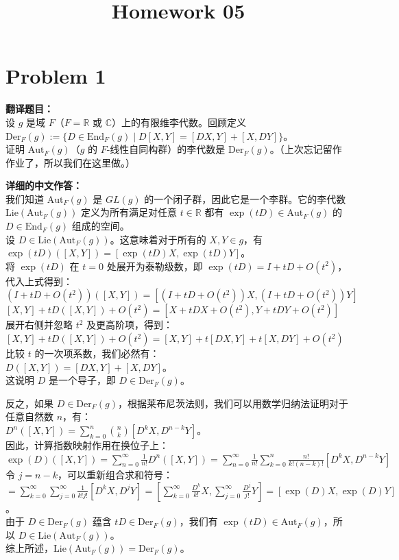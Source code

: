 \documentclass{ctexart}
\begin{document}
\title{Homework 05}
\author{}
\date{}
\maketitle

\section*{Problem 1}
\textbf{翻译题目：}\\
设 $g$ 是域 $F$（$F = \mathbb{R}$ 或 $\mathbb{C}$）上的有限维李代数。回顾定义\\
$\text{Der}_F(g) := \{D \in \text{End}_F(g) \mid D[X, Y] = [DX, Y] + [X, DY]\}$。\\
证明 $\text{Aut}_F(g)$（$g$ 的 $F$-线性自同构群）的李代数是 $\text{Der}_F(g)$。（上次忘记留作作业了，所以我们在这里做。）

\vspace{1em}
\textbf{详细的中文作答：}\\
我们知道 $\text{Aut}_F(g)$ 是 $GL(g)$ 的一个闭子群，因此它是一个李群。它的李代数 $\text{Lie}(\text{Aut}_F(g))$ 定义为所有满足对任意 $t \in \mathbb{R}$ 都有 $\exp(tD) \in \text{Aut}_F(g)$ 的 $D \in \text{End}_F(g)$ 组成的空间。\\
设 $D \in \text{Lie}(\text{Aut}_F(g))$。这意味着对于所有的 $X, Y \in g$，有\\
$\exp(tD)([X, Y]) = [\exp(tD)X, \exp(tD)Y]$。\\
将 $\exp(tD)$ 在 $t=0$ 处展开为泰勒级数，即 $\exp(tD) = I + tD + O(t^2)$，代入上式得到：\\
$(I + tD + O(t^2))([X, Y]) = [(I + tD + O(t^2))X, (I + tD + O(t^2))Y]$\\
$[X, Y] + tD([X, Y]) + O(t^2) = [X + tDX + O(t^2), Y + tDY + O(t^2)]$\\
展开右侧并忽略 $t^2$ 及更高阶项，得到：\\
$[X, Y] + tD([X, Y]) + O(t^2) = [X, Y] + t[DX, Y] + t[X, DY] + O(t^2)$\\
比较 $t$ 的一次项系数，我们必然有：\\
$D([X, Y]) = [DX, Y] + [X, DY]$。\\
这说明 $D$ 是一个导子，即 $D \in \text{Der}_F(g)$。

反之，如果 $D \in \text{Der}_F(g)$，根据莱布尼茨法则，我们可以用数学归纳法证明对于任意自然数 $n$，有：\\
$D^n([X, Y]) = \sum_{k=0}^n \binom{n}{k} [D^k X, D^{n-k} Y]$。\\
因此，计算指数映射作用在换位子上：\\
$\exp(D)([X, Y]) = \sum_{n=0}^\infty \frac{1}{n!} D^n([X, Y]) = \sum_{n=0}^\infty \frac{1}{n!} \sum_{k=0}^n \frac{n!}{k!(n-k)!} [D^k X, D^{n-k} Y]$\\
令 $j = n-k$，可以重新组合求和符号：\\
$= \sum_{k=0}^\infty \sum_{j=0}^\infty \frac{1}{k!j!} [D^k X, D^j Y] = \left[ \sum_{k=0}^\infty \frac{D^k}{k!} X, \sum_{j=0}^\infty \frac{D^j}{j!} Y \right] = [\exp(D)X, \exp(D)Y]$。\\
由于 $D \in \text{Der}_F(g)$ 蕴含 $tD \in \text{Der}_F(g)$，我们有 $\exp(tD) \in \text{Aut}_F(g)$，所以 $D \in \text{Lie}(\text{Aut}_F(g))$。\\
综上所述，$\text{Lie}(\text{Aut}_F(g)) = \text{Der}_F(g)$。
\end{document}
